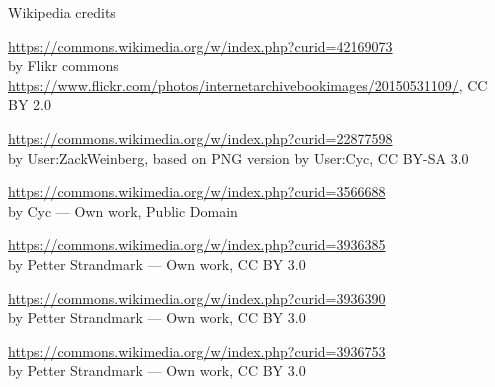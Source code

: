 \documentclass[handout]{beamer}   %
\begin{document}
\begin{frame}{Wikipedia credits}

  {\small
    
    \url{https://commons.wikimedia.org/w/index.php?curid=42169073}\\
    by Flikr commons
    \url{https://www.flickr.com/photos/internetarchivebookimages/20150531109/}, CC BY 2.0

    \medskip

    \url{https://commons.wikimedia.org/w/index.php?curid=22877598}\\ 
    by User:ZackWeinberg, based on PNG version by User:Cyc, CC BY-SA 3.0

    \medskip

    \url{https://commons.wikimedia.org/w/index.php?curid=3566688}\\
    by Cyc --- Own work, Public Domain

    \medskip

    \url{https://commons.wikimedia.org/w/index.php?curid=3936385}\\
    by Petter Strandmark --- Own work, CC BY 3.0

    \smallskip

    \url{https://commons.wikimedia.org/w/index.php?curid=3936390}\\
    by Petter Strandmark --- Own work, CC BY 3.0 

    \smallskip

    \url{https://commons.wikimedia.org/w/index.php?curid=3936753}\\
    by Petter Strandmark --- Own work, CC BY 3.0 

  }
  
\end{frame}


      
\end{document}
